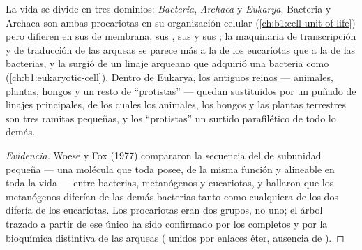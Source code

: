 \begin{proposition}\label{prop:b1:classifying-biodiversity:domains}
La vida se divide en tres dominios: \emph{Bacteria}, \emph{Archaea} y
\emph{Eukarya}. Bacteria y Archaea son ambas procariotas en su organización
celular (\cref{ch:b1:cell-unit-of-life}) pero difieren en sus  de
membrana, sus , sus  y sus ; la
maquinaria de transcripción y de traducción de las arqueas se parece más a
la de los eucariotas que a la de las bacterias, y la  surgió
de un linaje arqueano que adquirió una bacteria como 
(\cref{ch:b1:eukaryotic-cell}). Dentro de Eukarya, los antiguos reinos ---
animales, plantas, hongos y un resto de ``protistas'' --- quedan
sustituidos por un puñado de linajes principales, de los cuales los
animales, los hongos y las plantas terrestres son tres ramitas pequeñas, y
los ``protistas'' un surtido parafilético de todo lo demás.
\end{proposition}
\begin{proof}[Evidencia]
Woese y Fox (1977) compararon la secuencia del  de subunidad
pequeña --- una molécula que toda  posee, de la misma función y
alineable en toda la vida --- entre bacterias, metanógenos y eucariotas, y
hallaron que los metanógenos diferían de las demás bacterias tanto como
cualquiera de los dos difería de los eucariotas. Los procariotas eran dos
grupos, no uno; el árbol trazado a partir de ese único  ha sido
confirmado por los  completos y por la bioquímica distintiva de las
arqueas ( unidos por enlaces éter, ausencia de ).
\end{proof}


